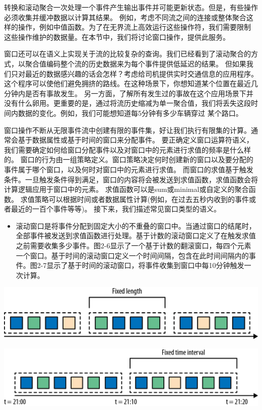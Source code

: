 \documentclass[cn,11pt,chinese]{elegantbook}
\providecommand{\tightlist}{%
  \setlength{\itemsep}{0pt}\setlength{\parskip}{0pt}}
\begin{document}
转换和滚动聚合一次处理一个事件产生输出事件并可能更新状态。但是，有些操作必须收集并缓冲数据以计算其结果。
例如，考虑不同流之间的连接或整体聚合这样的操作，例如中值函数。为了在无界流上高效运行这些操作符，我们需要限制
这些操作维护的数据量。在本节中，我们将讨论窗口操作，提供此服务。

窗口还可以在语义上实现关于流的比较复杂的查询。我们已经看到了滚动聚合的方式，以聚合值编码整个流的历史数据来为每个事件提供低延迟的结果。
但如果我们只对最近的数据感兴趣的话会怎样？考虑给司机提供实时交通信息的应用程序。这个程序可以使他们避免拥挤的路线。在这种场景下，你想知道某个位置在最近几分钟内是否有事故发生。
另一方面，了解所有发生过的事故在这个应用场景下并没有什么卵用。更重要的是，通过将流历史缩减为单一聚合值，我们将丢失这段时间内数据的变化。例如，我们可能想知道每5分钟有多少车辆穿过
某个路口。

窗口操作不断从无限事件流中创建有限的事件集，好让我们执行有限集的计算。通常会基于数据属性或基于时间的窗口来分配事件。
要正确定义窗口运算符语义，我们需要确定如何给窗口分配事件以及对窗口中的元素进行求值的频率是什么样的。
窗口的行为由一组策略定义。窗口策略决定何时创建新的窗口以及要分配的事件属于哪个窗口，以及何时对窗口中的元素进行求值。
而窗口的求值基于触发条件。一旦触发条件得到满足，窗口的内容将会被发送到求值函数，求值函数会将计算逻辑应用于窗口中的元素。
求值函数可以是sum或minimal或自定义的聚合函数。
求值策略可以根据时间或者数据属性计算(例如，在过去五秒内收到的事件或者最近的一百个事件等等)。
接下来，我们描述常见窗口类型的语义。

\begin{itemize}
\tightlist
\item
  滚动窗口是将事件分配到固定大小的不重叠的窗口中。当通过窗口的结尾时，全部事件被发送到求值函数进行处理。基于计数的滚动窗口定义了在触发求值之前需要收集多少事件。图2-6显示了一个基于计数的翻滚窗口，每四个元素一个窗口。基于时间的滚动窗口定义一个时间间隔，包含在此时间间隔内的事件。图2-7显示了基于时间的滚动窗口，将事件收集到窗口中每10分钟触发一次计算。
\end{itemize}

\includegraphics{images/spaf_0206.png}

\includegraphics{images/spaf_0207.png}
\end{document}
